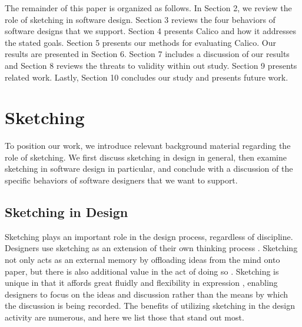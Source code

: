 The remainder of this paper is organized as follows. In Section 2, we review the role of sketching in software design. Section 3 reviews the four behaviors of software designs that we support. Section 4 presents Calico and how it addresses the stated goals. Section 5 presents our methods for evaluating Calico. Our results are presented in Section 6. Section 7 includes a discussion of our results and Section 8 reviews the threats to validity within out study. Section 9 presents related work. Lastly, Section 10 concludes our study and presents future work.

\section{Sketching}
\label{sketching}
To position our work, we introduce relevant background material regarding the role of sketching. We first discuss sketching in design in general, then examine sketching in software design in particular, and conclude with a discussion of the specific behaviors of software designers that we want to support.

\subsection{Sketching in Design}
\label{sketching:1}
Sketching plays an important role in the design process, regardless of discipline. Designers use sketching as an extension of their own thinking process \citep{Petre,Lawson}. Sketching not only acts as an external memory \citep{Newell} by offloading ideas from the mind onto paper, but there is also additional value in the act of doing so \citep{Schutze}. Sketching is unique in that it affords great fluidly and flexibility in expression \citep{Csikszentmihalyi}, enabling designers to focus on the ideas and discussion rather than the means by which the discussion is being recorded. The benefits of utilizing sketching in the design activity are numerous, and here we list those that stand out most.

